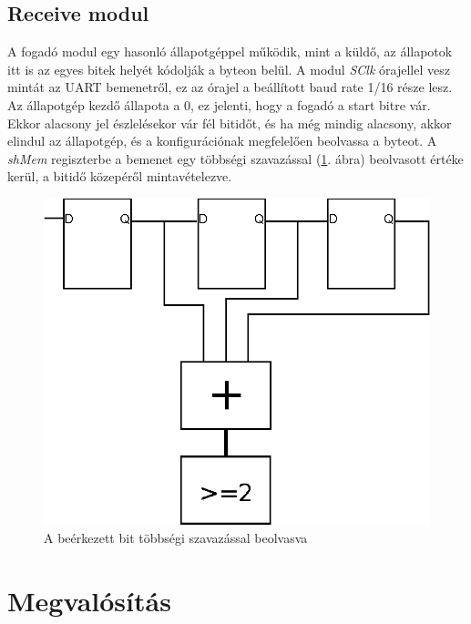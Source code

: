 \subsection{Receive modul}
A fogadó modul egy hasonló állapotgéppel működik, mint a küldő, az állapotok itt is az egyes bitek helyét kódolják a byteon belül. A modul \textit{SClk} órajellel vesz mintát az UART bemenetről, ez az órajel a beállított baud rate 1/16 része lesz. Az állapotgép kezdő állapota a 0, ez jelenti, hogy a fogadó a start bitre vár. Ekkor alacsony jel észlelésekor vár fél bitidőt, és ha még mindig alacsony, akkor elindul az állapotgép, és a konfigurációnak megfelelően beolvassa a byteot. A \textit{shMem} regiszterbe a bemenet egy többségi szavazással (\ref{fig:voter}. ábra) beolvasott értéke kerül, a bitidő közepéről mintavételezve.

\begin{figure}[h]
\vspace{0.5cm}
\begin{center}
\includegraphics{figures/voter.eps}
\caption{A beérkezett bit többségi szavazással beolvasva}
\label{fig:voter}
\end{center}
\vspace{0.5cm}
\end{figure}

\section{Megvalósítás}

